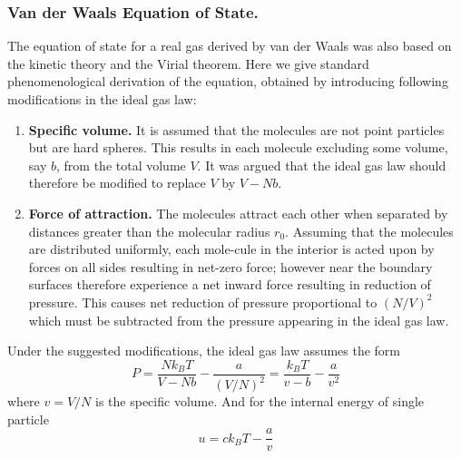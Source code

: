 \documentclass[../../../Main.tex]{subfiles}
\begin{document}
\subsubsection{Van der Waals Equation of State.} The equation of state for a real gas derived by van der Waals was also based on the kinetic theory and the Virial theorem. Here we give standard phenomenological derivation of the equation, obtained by introducing following modifications in the ideal gas law:
\begin{enumerate}
    \item \textbf{Specific volume.} It is assumed that the molecules are not point particles but are hard spheres. This results in each molecule excluding some volume, say $b$, from the total volume $V$. It was argued that the ideal gas law should therefore be modified to replace $V$ by $V - N b$.
    \item \textbf{Force of attraction.} The molecules attract each other when separated by distances greater than the molecular radius $r_0$. Assuming that the molecules are distributed uniformly, each mole-cule in the interior is acted upon by forces on all sides resulting in net-zero force; however near the boundary surfaces therefore experience a net inward force resulting in reduction of pressure. This causes net reduction of pressure proportional to $(N /V )^2$ which must be subtracted from the pressure appearing in the ideal gas law.
\end{enumerate}
Under the suggested modifications, the ideal gas law assumes the form
\begin{equation*}
    P=\frac{Nk_B T}{V-Nb}-\frac{a}{(V/N)^2}=\frac{k_BT}{v-b}- \frac{a}{v^2}
\end{equation*}
where $v=V/N$ is the specific volume. And for the internal energy of single particle
\begin{equation*}
    u=ck_BT-\frac{a}{v}
\end{equation*}
\end{document}
